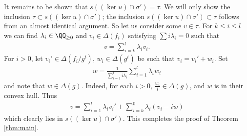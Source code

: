 It remains to be shown that $s( (\ker u)\cap \sigma')=\tau$. We will only show the inclusion $\tau \subset s( (\ker u)\cap \sigma')$; the inclusion $s( (\ker u)\cap \sigma')\subset \tau$ follows from an almost identical argument. So let us consider some $v\in\tau$. For $k\leq i \leq l$ we can f\/ind $\lambda_i\in\QQ_{\geq 0}$ and $v_i\in\Delta(f_i)$ satisfying $\sum i\lambda_i=0$ such that
\begin{gather*}
v=\sum_{i=k}^l \lambda_i v_i.
\end{gather*}
For $i>0$, let $v_i'\in\Delta(f_i/g^i)$, $w_i\in\Delta(g^i)$ be such that $v_i=v_i'+w_i$.
Set
\begin{gather*}
w=\frac{1}{\sum\limits_{i=1}^l i \lambda_i}
\sum\limits_{i=1}^l{\lambda_i w_i}\end{gather*}
and note that $w\in\Delta(g)$.
Indeed, for each $i>0$, $\frac{w_i}{i}\in\Delta(g)$, and $w$ is in their convex hull.
Thus
\begin{gather*}
v=\sum_{i=1}^l \lambda_i v_i'+\sum_{i=k}^0 \lambda_i(v_i-iw)
\end{gather*}
which clearly lies in $s( (\ker u)\cap \sigma')$. This completes the proof of Theorem \ref{thm:main}.
